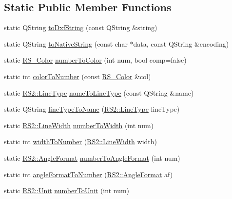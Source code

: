 \subsection*{Static Public Member Functions}
\begin{DoxyCompactItemize}
\item 
static Q\-String \hyperlink{classRS__FilterDXF_a0f993f9a3e6c7ea7c9d428759eb1ca6f}{to\-Dxf\-String} (const Q\-String \&string)
\item 
static Q\-String \hyperlink{classRS__FilterDXF_a6f6a6d4486c1933b43a144beb87f0bc5}{to\-Native\-String} (const char $\ast$data, const Q\-String \&encoding)
\item 
static \hyperlink{classRS__Color}{R\-S\-\_\-\-Color} \hyperlink{classRS__FilterDXF_a193e3412c428ae7c514ddc33d8d76c90}{number\-To\-Color} (int num, bool comp=false)
\item 
static int \hyperlink{classRS__FilterDXF_afc1dba9a5af52005984da5cfe64177a6}{color\-To\-Number} (const \hyperlink{classRS__Color}{R\-S\-\_\-\-Color} \&col)
\item 
static \hyperlink{classRS2_a6f3a82972c2d62456f6cacb74e14c95f}{R\-S2\-::\-Line\-Type} \hyperlink{classRS__FilterDXF_abc5d789e59f1b97767f2e3c12de66e25}{name\-To\-Line\-Type} (const Q\-String \&name)
\item 
static Q\-String \hyperlink{classRS__FilterDXF_af6758fade47b20a72c82f1b93dc68b9b}{line\-Type\-To\-Name} (\hyperlink{classRS2_a6f3a82972c2d62456f6cacb74e14c95f}{R\-S2\-::\-Line\-Type} line\-Type)
\item 
static \hyperlink{classRS2_a023485c482c5ee9e36b3dfad781adf29}{R\-S2\-::\-Line\-Width} \hyperlink{classRS__FilterDXF_a8854df00388046f8547058a8f346a6b7}{number\-To\-Width} (int num)
\item 
static int \hyperlink{classRS__FilterDXF_a19102ec33971271740ae198241abef0b}{width\-To\-Number} (\hyperlink{classRS2_a023485c482c5ee9e36b3dfad781adf29}{R\-S2\-::\-Line\-Width} width)
\item 
static \hyperlink{classRS2_a9c7a07b03f910b04154536a28c151277}{R\-S2\-::\-Angle\-Format} \hyperlink{classRS__FilterDXF_a3107d89edacf212f3817277e7cfe3d50}{number\-To\-Angle\-Format} (int num)
\item 
static int \hyperlink{classRS__FilterDXF_aed6b20b1427a3379d72c3e2a29d726b2}{angle\-Format\-To\-Number} (\hyperlink{classRS2_a9c7a07b03f910b04154536a28c151277}{R\-S2\-::\-Angle\-Format} af)
\item 
static \hyperlink{classRS2_ad859751df6978737e4f35ec111ff9828}{R\-S2\-::\-Unit} \hyperlink{classRS__FilterDXF_aab439645c4219f35e470d9888137365e}{number\-To\-Unit} (int num)

\end{DoxyCompactItemize}
